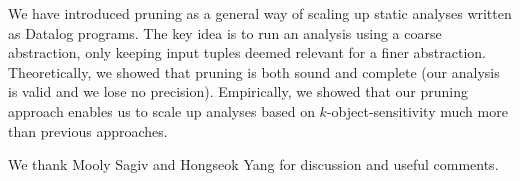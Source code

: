 
We have introduced pruning as a general way of scaling up static analyses
written as Datalog programs.  The key idea is to run an analysis using a coarse
abstraction, only keeping input tuples deemed relevant for a finer abstraction.
Theoretically, we showed that pruning is both sound and complete (our analysis
is valid and we lose no precision).  Empirically, we showed that our pruning
approach enables us to scale up analyses based on $k$-object-sensitivity much
more than previous approaches.

\acks
We thank Mooly Sagiv and Hongseok Yang for discussion and useful comments.
